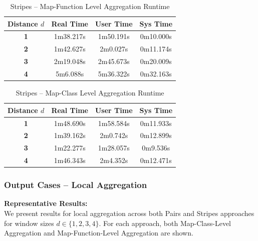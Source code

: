 \documentclass[12pt,a4paper]{article}
\begin{document}
\begin{table}[H]
  \centering
  \caption{Stripes -- Map-Function Level Aggregation Runtime}
  \label{tab:stripes_fn_agg}
  \renewcommand{\arraystretch}{1.4}
  \begin{tabular}{>{\bfseries}c ccc}
    \toprule
    \rowcolor{lightblue}
    \textbf{Distance $d$} & \textbf{Real Time} & \textbf{User Time} & \textbf{Sys Time} \\
    \midrule
    1 & 1m38.217s & 1m50.191s & 0m10.000s \\
    2 & 1m42.627s & 2m0.027s & 0m11.174s \\
    3 & 2m19.048s & 2m45.673s & 0m20.009s \\
    4 & 5m6.088s & 5m36.322s & 0m32.163s \\
    \bottomrule
  \end{tabular}
\end{table}

\begin{table}[H]
  \centering
  \caption{Stripes -- Map-Class Level Aggregation Runtime}
  \label{tab:stripes_cls_agg}
  \renewcommand{\arraystretch}{1.4}
  \begin{tabular}{>{\bfseries}c ccc}
    \toprule
    \rowcolor{lightblue}
    \textbf{Distance $d$} & \textbf{Real Time} & \textbf{User Time} & \textbf{Sys Time} \\
    \midrule
    1 & 1m48.690s & 1m58.584s & 0m11.933s \\
    2 & 1m39.162s & 2m0.742s & 0m12.899s \\
    3 & 1m22.277s & 1m28.057s & 0m9.536s \\
    4 & 1m46.343s & 2m4.352s & 0m12.471s \\
    \bottomrule
  \end{tabular}
\end{table}

\subsubsection{Output Cases -- Local Aggregation}

\begin{infobox}
  \textbf{Representative Results:} \\
  We present results for local aggregation across both Pairs and Stripes approaches for window sizes $d \in \{1,2,3,4\}$. 
  For each approach, both Map-Class-Level Aggregation and Map-Function-Level Aggregation are shown. 
\end{infobox}
\end{document}
